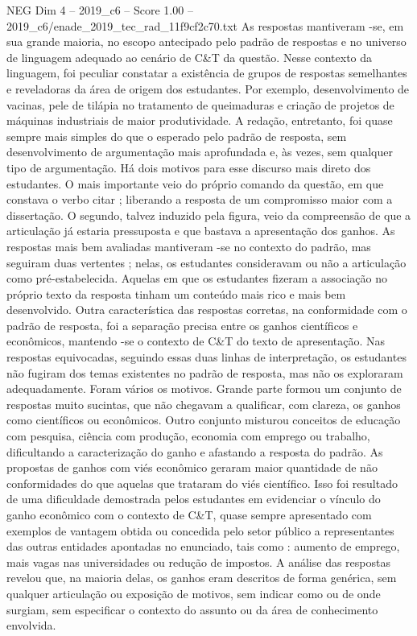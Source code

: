 \begin{textsample}{NEG Dim 4 – 2019\_c6 – Score 1.00 – 2019\_c6/enade\_2019\_tec\_rad\_11f9cf2c70.txt}
As respostas mantiveram -se, em sua grande maioria, no escopo antecipado pelo padrão de respostas e no universo de linguagem adequado ao cenário de C\&T da questão.
Nesse contexto da linguagem, foi peculiar constatar a existência de grupos de respostas semelhantes e reveladoras da área de origem dos estudantes.
Por exemplo, desenvolvimento de vacinas, pele de tilápia no tratamento de queimaduras e criação de projetos de máquinas industriais de maior produtividade.
A redação, entretanto, foi quase sempre mais simples do que o esperado pelo padrão de resposta, sem desenvolvimento de argumentação mais aprofundada e, às vezes, sem qualquer tipo de argumentação.
Há dois motivos para esse discurso mais direto dos estudantes.
O mais importante veio do próprio comando da questão, em que constava o verbo citar ; liberando a resposta de um compromisso maior com a dissertação.
O segundo, talvez induzido pela figura, veio da compreensão de que a articulação já estaria pressuposta e que bastava a apresentação dos ganhos.
As respostas mais bem avaliadas mantiveram -se no contexto do padrão, mas seguiram duas vertentes ; nelas, os estudantes consideravam ou não a articulação como pré-estabelecida.
Aquelas em que os estudantes fizeram a associação no próprio texto da resposta tinham um conteúdo mais rico e mais bem desenvolvido.
Outra característica das respostas corretas, na conformidade com o padrão de resposta, foi a separação precisa entre os ganhos científicos e econômicos, mantendo -se o contexto de C\&T do texto de apresentação.
Nas respostas equivocadas, seguindo essas duas linhas de interpretação, os estudantes não fugiram dos temas existentes no padrão de resposta, mas não os exploraram adequadamente.
Foram vários os motivos.
Grande parte formou um conjunto de respostas muito sucintas, que não chegavam a qualificar, com clareza, os ganhos como científicos ou econômicos.
Outro conjunto misturou conceitos de educação com pesquisa, ciência com produção, economia com emprego ou trabalho, dificultando a caracterização do ganho e afastando a resposta do padrão.
As propostas de ganhos com viés econômico geraram maior quantidade de não conformidades do que aquelas que trataram do viés científico.
Isso foi resultado de uma dificuldade demostrada pelos estudantes em evidenciar o vínculo do ganho econômico com o contexto de C\&T, quase sempre apresentado com exemplos de vantagem obtida ou concedida pelo setor público a representantes das outras entidades apontadas no enunciado, tais como : aumento de emprego, mais vagas nas universidades ou redução de impostos.
A análise das respostas revelou que, na maioria delas, os ganhos eram descritos de forma genérica, sem qualquer articulação ou exposição de motivos, sem indicar como ou de onde surgiam, sem especificar o contexto do assunto ou da área de conhecimento envolvida.

\end{textsample}

